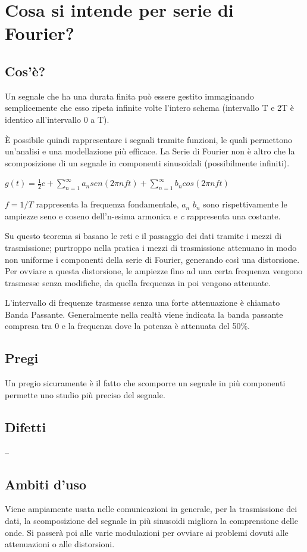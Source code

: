 \section{Cosa si intende per serie di Fourier?}
\subsection{Cos'è?}
Un segnale che ha una durata finita può essere gestito immaginando semplicemente che esso ripeta infinite volte l’intero schema (intervallo T e 2T è identico all’intervallo 0 a T).

È possibile quindi rappresentare i segnali tramite funzioni, le quali permettono un’analisi e una modellazione più efficace.
La Serie di Fourier non è altro che la scomposizione di un segnale in componenti sinusoidali (possibilmente infiniti).
\begin{center}
$g(t)=\frac{1}{2}c+\sum_{n=1}^\infty a_n sen(2\pi nft)+\sum_{n=1}^\infty b_n cos(2\pi nft)$ 
\end{center}

$f=1/T$ rappresenta la frequenza fondamentale, $a_n$  $b_n$  sono rispettivamente le ampiezze seno e coseno dell’n-esima armonica e \textit{c} rappresenta una costante.

Su questo teorema si basano le reti e il passaggio dei dati tramite i mezzi di trasmissione;
purtroppo nella pratica i mezzi di trasmissione attenuano in modo non uniforme i componenti della serie di Fourier, generando così una distorsione.
Per ovviare a questa distorsione, le ampiezze fino ad una certa frequenza vengono trasmesse senza modifiche, da quella frequenza in poi vengono attenuate.

L’intervallo di frequenze trasmesse senza una forte attenuazione è chiamato Banda Passante.
Generalmente nella realtà viene indicata la banda passante compresa tra 0 e la frequenza dove la potenza è attenuata del 50\%.
\subsection{Pregi}
Un pregio sicuramente è il fatto che scomporre un segnale in più componenti permette uno studio più preciso del segnale.

\subsection{Difetti}
--
\subsection{Ambiti d'uso}
Viene ampiamente usata nelle comunicazioni in generale, per la trasmissione dei dati, la scomposizione del segnale in più sinusoidi migliora la comprensione delle onde.
Si passerà poi alle varie modulazioni per ovviare ai problemi dovuti alle attenuazioni o alle distorsioni.

